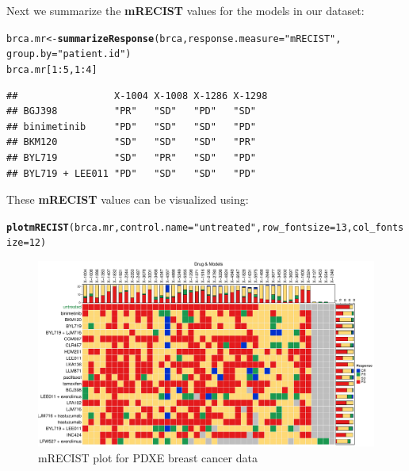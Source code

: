 \documentclass{article}\usepackage[]{graphicx}\usepackage[]{xcolor}
\makeatletter
\def\maxwidth{ %
  \ifdim\Gin@nat@width>\linewidth
    \linewidth
  \else
    \Gin@nat@width
  \fi
}
\newcommand{\hlnum}[1]{\textcolor[rgb]{0.686,0.059,0.569}{#1}}%
\newcommand{\hlstr}[1]{\textcolor[rgb]{0.192,0.494,0.8}{#1}}%
\newcommand{\hlopt}[1]{\textcolor[rgb]{0,0,0}{#1}}%
\newcommand{\hlstd}[1]{\textcolor[rgb]{0.345,0.345,0.345}{#1}}%
\newcommand{\hlkwb}[1]{\textcolor[rgb]{0.69,0.353,0.396}{#1}}%
\newcommand{\hlkwc}[1]{\textcolor[rgb]{0.333,0.667,0.333}{#1}}%
\newcommand{\hlkwd}[1]{\textcolor[rgb]{0.737,0.353,0.396}{\textbf{#1}}}%
\newenvironment{kframe}{%
 \def\at@end@of@kframe{}%
 \ifinner\ifhmode%
  \def\at@end@of@kframe{\end{minipage}}%
  \begin{minipage}{\columnwidth}%
 \fi\fi%
 \def\FrameCommand##1{\hskip\@totalleftmargin \hskip-\fboxsep
 \colorbox{shadecolor}{##1}\hskip-\fboxsep
     \hskip-\linewidth \hskip-\@totalleftmargin \hskip\columnwidth}%
 \MakeFramed {\advance\hsize-\width
   \@totalleftmargin\z@ \linewidth\hsize
   \@setminipage}}%
 {\par\unskip\endMakeFramed%
 \at@end@of@kframe}
\newenvironment{knitrout}{}{} %
\makeatother
\begin{document}
Next we summarize the \textbf{mRECIST} values for the models in our dataset:
\begin{knitrout}
\color{fgcolor}\begin{kframe}
\begin{alltt}
\hlstd{brca.mr} \hlkwb{<-} \hlkwd{summarizeResponse}\hlstd{(brca,} \hlkwc{response.measure}\hlstd{=}\hlstr{"mRECIST"}\hlstd{,}
                             \hlkwc{group.by}\hlstd{=}\hlstr{"patient.id"}\hlstd{)}
\hlstd{brca.mr[}\hlnum{1}\hlopt{:}\hlnum{5}\hlstd{,} \hlnum{1}\hlopt{:}\hlnum{4}\hlstd{]}
\end{alltt}
\begin{verbatim}
##                 X-1004 X-1008 X-1286 X-1298
## BGJ398          "PR"   "SD"   "PD"   "SD"  
## binimetinib     "PD"   "SD"   "SD"   "PD"  
## BKM120          "SD"   "SD"   "SD"   "PR"  
## BYL719          "SD"   "PR"   "SD"   "PD"  
## BYL719 + LEE011 "PD"   "SD"   "SD"   "PD"
\end{verbatim}
\end{kframe}
\end{knitrout}

These \textbf{mRECIST} values can be visualized using:
\begin{knitrout}
\color{fgcolor}\begin{kframe}
\begin{alltt}
\hlkwd{plotmRECIST}\hlstd{(brca.mr,} \hlkwc{control.name}\hlstd{=}\hlstr{"untreated"}\hlstd{,} \hlkwc{row_fontsize}\hlstd{=}\hlnum{13}\hlstd{,} \hlkwc{col_fontsize}\hlstd{=}\hlnum{12}\hlstd{)}
\end{alltt}
\end{kframe}\begin{figure}
\includegraphics[width=\maxwidth]{figure/mR_BRCA-1} \caption[mRECIST plot for PDXE breast cancer data]{mRECIST plot for PDXE breast cancer data}\label{fig:mR_BRCA}
\end{figure}

\end{knitrout}
\end{document}
